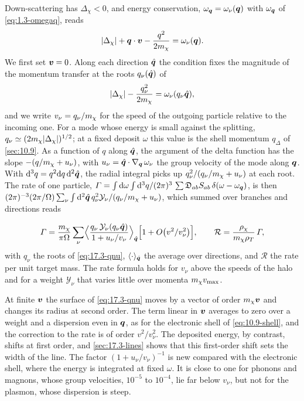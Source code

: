 Down-scattering has $\Delta_\chi < 0$, and energy conservation, $\omega_{\bm{q}} = \omega_\nu(\bm{q})$ with $\omega_{\bm{q}}$ of \cref{eq:1.3-omegaq}, reads
\begin{equation*}
  |\Delta_\chi| + \bm{q}\cdot\bm{v} - \frac{q^2}{2m_{\chi}} = \omega_\nu(\bm{q}) .
\end{equation*}
We first set $\bm{v} = 0$. Along each direction $\hat{\bm{q}}$ the condition fixes the magnitude of the momentum transfer at the roots $q_\nu(\hat{\bm{q}})$ of
\begin{equation}
  |\Delta_\chi| - \frac{q_\nu^2}{2m_{\chi}} = \omega_\nu(q_\nu\hat{\bm{q}}) ,
  \label{eq:17.3-qnu}
\end{equation}
and we write $v_\nu = q_\nu/m_{\chi}$ for the speed of the outgoing particle relative to the incoming one. For a mode whose energy is small against the splitting, $q_\nu \simeq (2m_{\chi}|\Delta_\chi|)^{1/2}$; at a fixed deposit $\omega$ this value is the shell momentum $q_\Delta$ of \cref{sec:10.9}. As a function of $q$ along $\hat{\bm{q}}$, the argument of the delta function has the slope $-(q/m_{\chi} + u_\nu)$, with $u_\nu = \hat{\bm{q}}\cdot\nabla_{\bm{q}}\,\omega_\nu$ the group velocity of the mode along $\bm{q}$. With $\mathrm{d}^3q = q^2\mathrm{d} q\,\mathrm{d}^2\hat{\bm{q}}$, the radial integral picks up $q_\nu^2/(q_\nu/m_{\chi} + u_\nu)$ at each root. The rate of one particle, $\varGamma = \int\mathrm{d}\omega\int\mathrm{d}^3q/(2\pi)^3\,\sum\mathfrak{D}_{ab}S_{ab}\,\delta(\omega - \omega_{\bm{q}})$, is then $(2\pi)^{-3}(2\pi/\Omega)\sum_\nu\int\mathrm{d}^2\hat{\bm{q}}\,q_\nu^2\mathcal{Y}_\nu/(q_\nu/m_{\chi} + u_\nu)$, which summed over branches and directions reads
\begin{keyresult}
\begin{equation}
  \varGamma = \frac{m_{\chi}}{\pi\Omega}\sum_\nu\Bigl\langle\frac{q_\nu\,\mathcal{Y}_\nu(q_\nu\hat{\bm{q}})}{1 + u_\nu/v_\nu}\Bigr\rangle_{\hat{\bm{q}}}\Bigl[1 + O\bigl(v^2/v_\nu^2\bigr)\Bigr] , \qquad
  \mathcal{R} = \frac{\rho_\chi}{m_{\chi}\rho_T}\,\varGamma ,
  \label{eq:17.3-rate}
\end{equation}
with $q_\nu$ the roots of \cref{eq:17.3-qnu}, $\langle\cdot\rangle_{\hat{\bm{q}}}$ the average over directions, and $\mathcal{R}$ the rate per unit target mass. The rate formula holds for $v_\nu$ above the speeds of the halo and for a weight $\mathcal{Y}_\nu$ that varies little over momenta $m_{\chi} v_{\mathrm{max}}$.
\end{keyresult}
\noindent At finite $\bm{v}$ the surface of \cref{eq:17.3-qnu} moves by a vector of order $m_{\chi}\bm{v}$ and changes its radius at second order. The term linear in $\bm{v}$ averages to zero over a weight and a dispersion even in $\bm{q}$, as for the electronic shell of \cref{eq:10.9-shell}, and the correction to the rate is of order $v^2/v_\nu^2$. The deposited energy, by contrast, shifts at first order, and \cref{sec:17.3-lines} shows that this first-order shift sets the width of the line. The factor $(1 + u_\nu/v_\nu)^{-1}$ is new compared with the electronic shell, where the energy is integrated at fixed $\omega$. It is close to one for phonons and magnons, whose group velocities, $10^{-5}$ to $10^{-4}$, lie far below $v_\nu$, but not for the plasmon, whose dispersion is steep.

